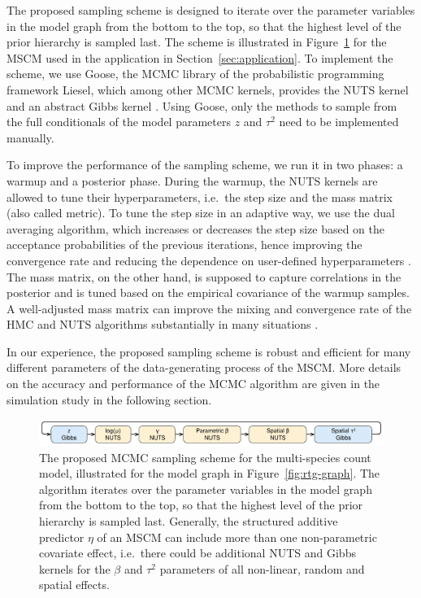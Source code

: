 \documentclass{article}
\begin{document}
The proposed sampling scheme is designed to iterate over the parameter variables in the model graph from the bottom to the top, so that the highest level of the prior hierarchy is sampled last. The scheme is illustrated in Figure~\ref{fig:rtg-mcmc} for the MSCM used in the application in Section~\ref{sec:application}. To implement the scheme, we use Goose, the MCMC library of the probabilistic programming framework Liesel, which among other MCMC kernels, provides the NUTS kernel and an abstract Gibbs kernel \citep{rieblLiesel2022}. Using Goose, only the methods to sample from the full conditionals of the model parameters $z$ and $\tau^2$ need to be implemented manually.

To improve the performance of the sampling scheme, we run it in two phases: a warmup and a posterior phase. During the warmup, the NUTS kernels are allowed to tune their hyperparameters, i.e.~the step size and the mass matrix (also called metric). To tune the step size in an adaptive way, we use the dual averaging algorithm, which increases or decreases the step size based on the acceptance probabilities of the previous iterations, hence improving the convergence rate and reducing the dependence on user-defined hyperparameters \citep{hoffmanNoUTurn2014, nesterovPrimaldual2009}. The mass matrix, on the other hand, is supposed to capture correlations in the posterior and is tuned based on the empirical covariance of the warmup samples. A well-adjusted mass matrix can improve the mixing and convergence rate of the HMC and NUTS algorithms substantially in many situations \citep{betancourtConceptual2018}.

In our experience, the proposed sampling scheme is robust and efficient for many different parameters of the data-generating process of the MSCM. More details on the accuracy and performance of the MCMC algorithm are given in the simulation study in the following section.

\begin{figure}
\centering
\includegraphics[width=\linewidth]{figures/rtg-mcmc}
\caption{The proposed MCMC sampling scheme for the multi-species count model, illustrated for the model graph in Figure~\ref{fig:rtg-graph}. The algorithm iterates over the parameter variables in the model graph from the bottom to the top, so that the highest level of the prior hierarchy is sampled last. Generally, the structured additive predictor $\eta$ of an MSCM can include more than one non-parametric covariate effect, i.e.~there could be additional NUTS and Gibbs kernels for the $\beta$ and $\tau^2$ parameters of all non-linear, random and spatial effects.}
\label{fig:rtg-mcmc}
\end{figure}
\end{document}
